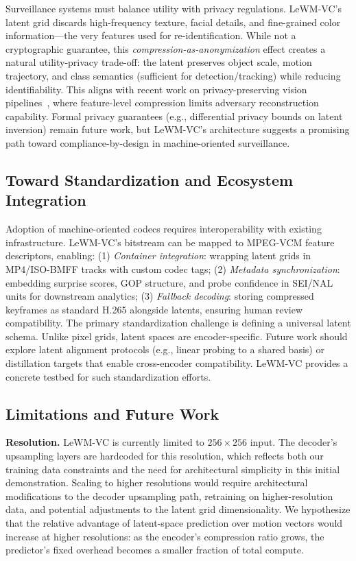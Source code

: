 \documentclass{article}
\begin{document}
Surveillance systems must balance utility with privacy regulations. LeWM-VC's latent grid discards high-frequency texture, facial details, and fine-grained color information---the very features used for re-identification. While not a cryptographic guarantee, this \textit{compression-as-anonymization} effect creates a natural utility-privacy trade-off: the latent preserves object scale, motion trajectory, and class semantics (sufficient for detection/tracking) while reducing identifiability. This aligns with recent work on privacy-preserving vision pipelines~\cite{liu2021privacy}, where feature-level compression limits adversary reconstruction capability. Formal privacy guarantees (e.g., differential privacy bounds on latent inversion) remain future work, but LeWM-VC's architecture suggests a promising path toward compliance-by-design in machine-oriented surveillance.

\subsection{Toward Standardization and Ecosystem Integration}
\label{sec:standardization}

Adoption of machine-oriented codecs requires interoperability with existing infrastructure. LeWM-VC's bitstream can be mapped to MPEG-VCM feature descriptors, enabling: (1) \textit{Container integration}: wrapping latent grids in MP4/ISO-BMFF tracks with custom codec tags; (2) \textit{Metadata synchronization}: embedding surprise scores, GOP structure, and probe confidence in SEI/NAL units for downstream analytics; (3) \textit{Fallback decoding}: storing compressed keyframes as standard H.265 alongside latents, ensuring human review compatibility. The primary standardization challenge is defining a universal latent schema. Unlike pixel grids, latent spaces are encoder-specific. Future work should explore latent alignment protocols (e.g., linear probing to a shared basis) or distillation targets that enable cross-encoder compatibility. LeWM-VC provides a concrete testbed for such standardization efforts.

\subsection{Limitations and Future Work}

\textbf{Resolution.} LeWM-VC is currently limited to $256{\times}256$ input. The decoder's upsampling layers are hardcoded for this resolution, which reflects both our training data constraints and the need for architectural simplicity in this initial demonstration. Scaling to higher resolutions would require architectural modifications to the decoder upsampling path, retraining on higher-resolution data, and potential adjustments to the latent grid dimensionality. We hypothesize that the relative advantage of latent-space prediction over motion vectors would increase at higher resolutions: as the encoder's compression ratio grows, the predictor's fixed overhead becomes a smaller fraction of total compute.
\end{document}
